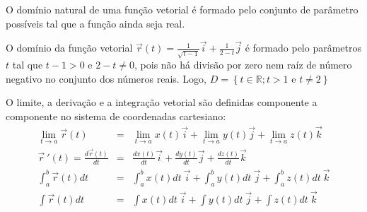 O domínio natural de uma função vetorial é formado pelo conjunto de parâmetro possíveis tal que a função ainda seja real.
\begin{ex}
 O domínio da função vetorial $\vec{r}(t)=\frac{1}{\sqrt{t-1}}\vec{i}+\frac{1}{2-t}\vec{j}$ é formado pelo parâmetros $t$ tal que $t-1>0$ e $2-t\neq 0$, pois não há divisão por zero nem raíz de número negativo no conjunto dos números reais. Logo, $D=\left\{t\in\mathbb{R}; t>1 \text{ e } t\neq 2\right\}$
\end{ex}


O limite, a derivação e a integração vetorial são definidas componente a componente no sistema de coordenadas cartesiano:
\begin{eqnarray}
\lim_{t\to a}\vec{r}(t)&=&\lim_{t\to a}x(t) \vec{i}+\lim_{t\to a}y(t)\vec{j}+\lim_{t\to a}z(t)\vec{k}\label{deflim}\\
\vec{r}~\!'(t)=\frac{d\vec{r}(t)}{dt}&=&\frac{d x(t)}{dt}\vec{i}+\frac{d y(t)}{dt}\vec{j}+\frac{d z(t)}{dt}\vec{k}\label{defder}\\
\int_{a}^b\vec{r}(t){dt}&=&\int_{a}^bx(t)dt~\!\vec{i}+\int_{a}^by(t)dt~\!\vec{j}+\int_{a}^bz(t)dt~\!\vec{k}\label{defint}\\
\int\vec{r}(t){dt}&=&\int x(t)dt~\!\vec{i}+\int y(t)dt~\!\vec{j}+\int z(t)dt~\!\vec{k}\label{defint2}
\end{eqnarray}

